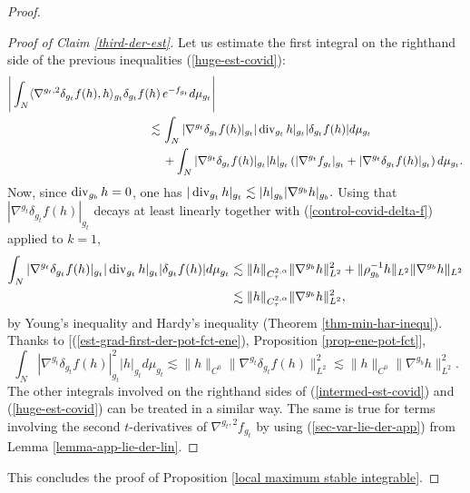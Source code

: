 \documentclass[a4paper,11pt,reqno]{amsart}
\def\div{\mathop{\rm div}\nolimits}
\def\div{\mathop{\rm div}\nolimits}
\numberwithin{equation}{section}
\begin{document}
\begin{proof}
\begin{proof}[Proof of Claim \ref{third-der-est}]
			Let us estimate the first integral on the righthand side of the previous inequalities (\ref{huge-est-covid}):			
			\begin{equation}
			\begin{split}\label{intermed-est-covid}
			\Bigg|\int_N\langle\nabla^{g_t,2}\delta_{g_t}f(h),h\rangle_{g_t}\delta_{g_t}f(h)\,&e^{-f_{g_t}}d\mu_{g_t}\Bigg|\\
			\lesssim\,& \int_N|\nabla^{g_t}\delta_{g_t}f(h)|_{g_t}|\div_{g_t}h|_{g_t}|\delta_{g_t}f(h)|d\mu_{g_t}\\
			&+\int_N|\nabla^{g_t}\delta_{g_t}f(h)|_{g_t}|h|_{g_t}\left(|\nabla^{g_t}f_{g_t}|_{g_t}+|\nabla^{g_t}\delta_{g_t}f(h)|_{g_t}\right)d\mu_{g_t}.
			\end{split}
			\end{equation}
			Now, since $\div_{g_b}h=0$, one has $|\div_{g_t}h|_{g_t}\lesssim |h|_{g_b}|\nabla^{g_b}h|_{g_b}.$ Using that $|\nabla^{g_t}\delta_{g_t}f(h)|_{g_t}$ decays at least linearly together with (\ref{control-covid-delta-f}) applied to $k=1$,
			\begin{equation*}
			\begin{split}
			\int_N|\nabla^{g_t}\delta_{g_t}f(h)|_{g_t}|\div_{g_t}h|_{g_t}|\delta_{g_t}f(h)|d\mu_{g_t}&\lesssim \|h\|_{C^{2,\alpha}_{\tau}}\|\nabla^{g_b}h\|_{L^2}^2+\|\rho_{g_b}^{-1}h\|_{L^2}\|\nabla^{g_b}h\|_{L^2}\\
			&\lesssim \|h\|_{C^{2,\alpha}_{\tau}}\|\nabla^{g_b}h\|_{L^2}^2,
			\end{split}
			\end{equation*}
			by Young's inequality and Hardy's inequality (Theorem \ref{thm-min-har-inequ}). Thanks to [(\ref{est-grad-first-der-pot-fct-ene}), Proposition \ref{prop-ene-pot-fct}],
			\begin{equation*}
			\int_N|\nabla^{g_t}\delta_{g_t}f(h)|^2_{g_t}|h|_{g_t}d\mu_{g_t}\lesssim\|h\|_{C^0}\|\nabla^{g_t}\delta_{g_t}f(h)\|_{L^2}^2\lesssim \|h\|_{C^0}\|\nabla^{g_b}h\|_{L^2}^2.
			\end{equation*}
			The other integrals involved on the righthand sides of (\ref{intermed-est-covid}) and (\ref{huge-est-covid})  can be treated in a similar way. The same is true for terms involving the second $t$-derivatives of $\nabla^{g_t,2}f_{g_t}$ by using (\ref{sec-var-lie-der-app}) from Lemma \ref{lemma-app-lie-der-lin}.
		\end{proof}
		This concludes the proof of Proposition \ref{local maximum stable integrable}.
	\end{proof}
	
\end{document}
